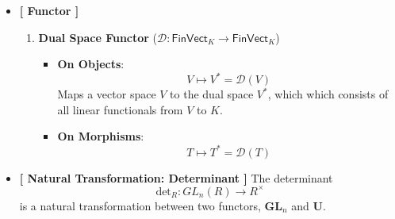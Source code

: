 \begin{example}
\begin{itemize}
	\item[] \textbf{[ Functor ]}
	\begin{enumerate}
		\item \textbf{Dual Space Functor} ($\mathcal{D}:\mathsf{FinVect}_K\to\mathsf{FinVect}_K$)
		\begin{itemize}
			\item \textbf{On Objects}: \[
			V\mapsto V^*=\mathcal{D}(V)
			\] Maps a vector space $V$ to the dual space $V^*$, which  which consists of all linear functionals from $V$ to $K$.
			\item \textbf{On Morphisms}:\[
			T\mapsto T^*=\mathcal{D}(T)
			\]
		\end{itemize}
	\end{enumerate}
	\item \textbf{[ Natural Transformation: Determinant ]} The determinant \[
	\text{det}_R:GL_n(R)\to R^{\times}
	\] is a natural transformation between two functors, $\mathbf{GL}_n$ and $\mathbf{U}$.
\end{itemize}
\end{example}

